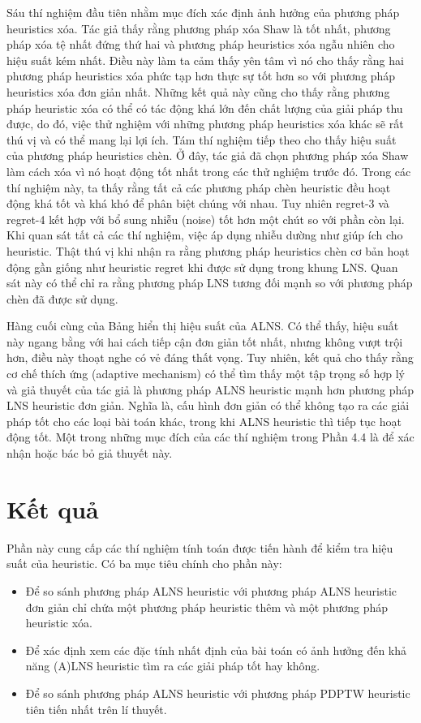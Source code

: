 Sáu thí nghiệm đầu tiên nhằm mục đích xác định ảnh hưởng của phương pháp heuristics xóa. Tác giả thấy rằng phương pháp xóa Shaw là tốt nhất, phương pháp xóa tệ nhất đứng thứ hai và phương pháp heuristics xóa ngẫu nhiên cho hiệu suất kém nhất. Điều này làm ta cảm thấy yên tâm vì nó cho thấy rằng hai phương pháp heuristics xóa phức tạp hơn thực sự tốt hơn so với phương pháp heuristics xóa đơn giản nhất. Những kết quả này cũng cho thấy rằng phương pháp heuristic xóa có thể có tác động khá lớn đến chất lượng của giải pháp thu được, do đó, việc thử nghiệm với những phương pháp heuristics xóa khác sẽ rất thú vị và có thể mang lại lợi ích.
Tám thí nghiệm tiếp theo cho thấy hiệu suất của phương pháp heuristics chèn. Ở đây, tác giả đã chọn phương pháp xóa Shaw làm cách xóa vì nó hoạt động tốt nhất trong các thử nghiệm trước đó. Trong các thí nghiệm này, ta thấy rằng tất cả các phương pháp  chèn heuristic đều hoạt động khá tốt và khá khó để phân biệt chúng với nhau. Tuy nhiên regret-3 và regret-4 kết hợp với bổ sung nhiễu (noise) tốt hơn một chút so với phần còn lại. Khi quan sát tất cả các thí nghiệm, việc áp dụng nhiễu dường như giúp ích cho heuristic. Thật thú vị khi nhận ra rằng phương pháp heuristics chèn cơ bản hoạt động gần giống như heuristic regret khi được sử dụng trong khung LNS. Quan sát này có thể chỉ ra rằng phương pháp LNS tương đối mạnh so với phương pháp chèn đã được sử dụng.

Hàng cuối cùng của Bảng hiển thị hiệu suất của ALNS. Có thể thấy, hiệu suất này ngang bằng với hai cách tiếp cận đơn giản tốt nhất, nhưng không vượt trội hơn, điều này thoạt nghe có vẻ đáng thất vọng. Tuy nhiên, kết quả cho thấy rằng cơ chế thích ứng (adaptive mechanism) có thể tìm thấy một tập trọng số hợp lý và giả thuyết của tác giả là phương pháp ALNS heuristic mạnh hơn phương pháp LNS heuristic đơn giản. Nghĩa là, cấu hình đơn giản có thể không tạo ra các giải pháp tốt cho các loại bài toán khác, trong khi ALNS heuristic thì tiếp tục hoạt động tốt.
Một trong những mục đích của các thí nghiệm trong Phần 4.4 là để xác nhận hoặc bác bỏ giả thuyết này.

\section{Kết quả}
Phần này cung cấp các thí nghiệm tính toán được tiến hành để kiểm tra hiệu suất của heuristic. Có ba mục tiêu chính cho phần này:
\begin{itemize}
    \item Để so sánh phương pháp ALNS heuristic với phương pháp ALNS heuristic đơn giản chỉ chứa một phương pháp heuristic thêm và một phương pháp heuristic xóa.
    \item Để xác định xem các đặc tính nhất định của bài toán có ảnh hưởng đến khả năng (A)LNS heuristic tìm ra các giải pháp tốt hay không.
    \item Để so sánh phương pháp ALNS heuristic với phương pháp PDPTW heuristic tiên tiến nhất trên lí thuyết.
   
\end{itemize}

